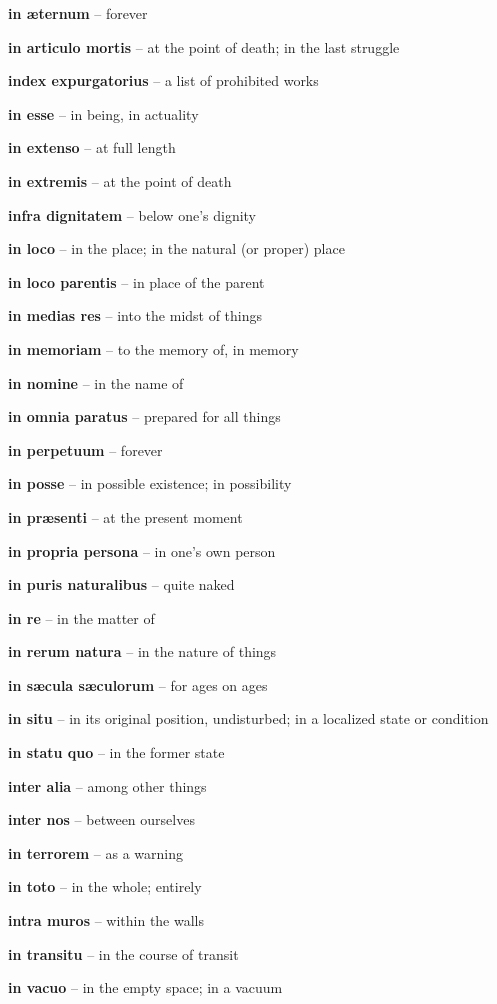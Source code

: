 \documentclass[12pt]{article}
\newcommand{\lat}[1]{\textbf{#1}}
\begin{document}
\lat{in \ae{ternum}} -- forever

\lat{in articulo mortis} -- at the point of death; in the last struggle

\lat{index expurgatorius} -- a list of prohibited works

\lat{in esse} -- in being, in actuality

\lat{in extenso} -- at full length

\lat{in extremis} -- at the point of death

\lat{infra dignitatem} -- below one's dignity

\lat{in loco} -- in the place; in the natural (or proper) place

\lat{in loco parentis} -- in place of the parent

\lat{in medias res} -- into the midst of things

\lat{in memoriam} -- to the memory of, in memory

\lat{in nomine} -- in the name of

\lat{in omnia paratus} -- prepared for all things

\lat{in perpetuum} -- forever

\lat{in posse} -- in possible existence; in possibility

\lat{in pr\ae{senti}} -- at the present moment

\lat{in propria persona} -- in one's own person

\lat{in puris naturalibus} -- quite naked

\lat{in re} -- in the matter of

\lat{in rerum natura} -- in the nature of things

\lat{in s{\ae}cula s{\ae}culorum} -- for ages on ages

\lat{in situ} -- in its original position, undisturbed; in a localized state or condition

\lat{in statu quo} -- in the former state

\lat{inter alia} -- among other things

\lat{inter nos} -- between ourselves

\lat{in terrorem} -- as a warning

\lat{in toto} -- in the whole; entirely

\lat{intra muros} -- within the walls

\lat{in transitu} -- in the course of transit

\lat{in vacuo}  -- in the empty space; in a vacuum
\end{document}
